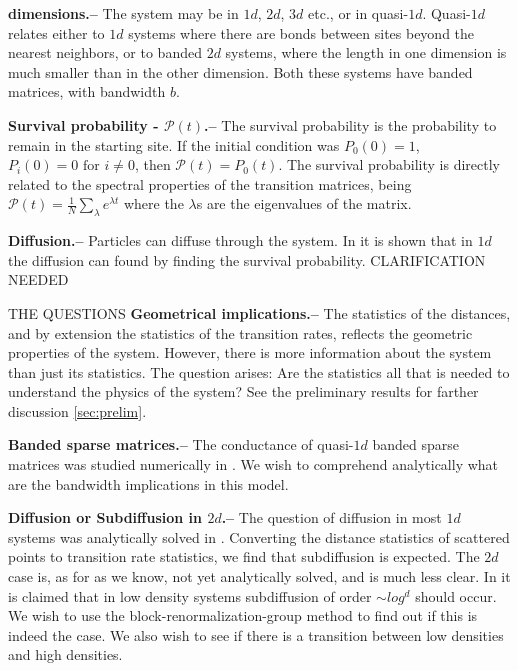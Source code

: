 \documentclass[onecolumn,fleqn,notitlepage,secnumarabic]{revtex4}
\begin{document}
{ \bf dimensions.-- } The system may be in $1d$, $2d$, $3d$ etc., or in quasi-$1d$. Quasi-$1d$ relates either to $1d$ systems where there are bonds between sites beyond the nearest neighbors, or to banded $2d$ systems, where the length in one dimension is much smaller than in the other dimension. Both these systems have banded matrices, with bandwidth $b$.

{ \bf Survival probability - $\mathcal{P}(t)$.--} 
The survival probability is the probability to remain in the starting site. If the initial condition was $P_0(0)=1$, $P_i(0)=0 \textrm{  for  } i\neq 0$, then $\mathcal{P}(t)= P_0(t)$. The survival probability is directly related to the spectral properties of the transition matrices, being $\mathcal{P}(t) = \frac{1}{N}\sum_\lambda e^{\lambda t}$ where the $\lambda$s are the eigenvalues of the matrix.

{ \bf Diffusion.--}
Particles can diffuse through the system. In \cite{Alexander:1981:RMP} it is shown that in $1d$ the diffusion can found by finding the survival probability. CLARIFICATION NEEDED


THE QUESTIONS
{ \bf Geometrical implications.-- }  The statistics of the distances, and by extension  the statistics of the transition rates, reflects the geometric properties of the system. However, there is more information about the system than just its statistics. The question arises: Are the statistics all that is needed to understand the physics of the system? See the preliminary results for farther discussion \ref{sec:prelim}.

{ \bf Banded sparse matrices.-- } The conductance of quasi-$1d$ banded sparse matrices was studied numerically in \cite{Stotland:2010:PRB}. We wish to comprehend analytically what are the bandwidth implications in this model.

{ \bf Diffusion or Subdiffusion in $2d$.-- } The question of diffusion in most $1d$ systems was analytically solved in \cite{Alexander:1981:RMP}. Converting the distance statistics of scattered points to transition rate statistics, we find that subdiffusion is expected. The $2d$ case is, as for as we know, not yet analytically solved, and is much less clear. In \cite{Amir:2010:PRL} it is claimed that in low density systems subdiffusion of order $\sim log^d$ should occur. We wish to use the block-renormalization-group method to find out if this is indeed the case. We also wish to see if there is a transition between low densities and high densities.
\end{document}
